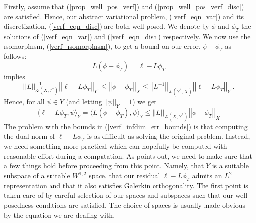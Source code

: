 \documentclass[12pt,a4paper]{article}
\theoremstyle{definition}
\begin{document}
Firstly, assume that (\ref{prop_well_pos_verf}) and (\ref{prop_well_pos_verf_disc}) are satisfied.  Hence, our abstract variational problem, (\ref{verf_eqn_var}) and its discretization, (\ref{verf_eqn_disc}) are both well-posed.   We denote by $\phi$ and $\phi_T$ the solutions of (\ref{verf_eqn_var}) and (\ref{verf_eqn_disc}) respectively. We now use the isomorphism,  (\ref{verf_isomorphism}), to get a bound on our error, $\phi-\phi_T$ as follows:
\begin{equation}
L\left(\phi-\phi_T\right)=\ell -L\phi_T
\end{equation}
implies
\begin{equation}\label{verf_infdim_err_bounds}
\left|\left|L\right|\right|^{-1}_{\mathcal{L}\left(X,Y^*\right)}\left|\left|\ell-L\phi_T\right|\right|_{Y^*}\leq \left|\left|\phi-\phi_T\right|\right|_X \leq \left|\left|L^{-1}\right|\right|_{\mathcal{L}\left(Y^*,X\right)}\left|\left|\ell-L\phi_T\right|\right|_{Y^*}.
\end{equation}
Hence, for all $\psi \in Y$ (and letting $\left|\left|\psi\right|\right|_Y=1$) we get 
\begin{equation}
\langle\ell -L\phi_T,\psi \rangle_Y=\langle L\left( \phi-\phi_T\right),\psi \rangle_Y\leq \left|\left|L\right|\right|_{\mathcal{L}\left(X,Y^*\right)}\left|\left|\phi-\phi_T\right|\right|_X
\end{equation}
The problem with the bounds in (\ref{verf_infdim_err_bounds}) is that computing the dual norm of $\ell-L\phi_T$ is as difficult as solving the original problem.  Instead, we need something more practical which can hopefully be computed with reasonable effort during a computation.   As \cite{verfurth2013posteriori} points out, we need to make sure that a few things hold before proceeding from this point. Namely, that $Y$ is a suitable subspace of a suitable $W^{1,2}$ space,
that our residual $\ell - L\phi_T$ admits an $L^2$ representation and that it also satisfies Galerkin orthogonality.  The first point is taken care of by careful selection of our spaces and subspaces such that our well-posedness conditions are satisfied.  The choice of spaces is usually made obvious by the equation we are dealing with.  
\end{document}
